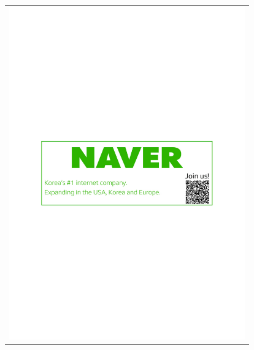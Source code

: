\thispagestyle{empty}
\thispagestyle{empty}
\begin{center}
\begin{tabular}{c}
  \includegraphics[width=4in]{content/ads/silver/Naver-EMNLP2021.pdf} \\

\end{tabular}
\end{center}
